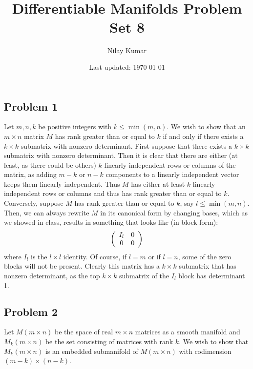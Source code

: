 \documentclass{../../mathnotes}
\title{Differentiable Manifolds Problem Set 8}
\author{Nilay Kumar}
\date{Last updated: \today}
\begin{document}
\maketitle

\subsection*{Problem 1}

Let $m,n,k$ be positive integers with $k\leq\min(m,n)$. We wish to show that an $m\times n$ matrix $M$ has rank greater
than or equal to $k$ if and only if there exists a $k\times k$ submatrix with nonzero determinant.
First suppose that there exists a $k\times k$ submatrix with nonzero determinant. Then it is clear that
there are either (at least, as there could be others) $k$ linearly independent rows or columns of the matrix, as adding $m-k$ or $n-k$ components
to a linearly independent vector keeps them linearly independent. Thus $M$ has either at least $k$ linearly independent rows
or columns and thus has rank greater than or equal to $k$.
Conversely, suppose $M$ has rank greater than or equal to $k$, say $l\leq \min(m,n)$. Then, we can always rewrite $M$ in its canonical form
by changing bases, which as we showed in class, results in something that looks like (in block form):
\begin{align*}
    \left(\begin{array}[]{cc}
        I_l & 0 \\
        0 & 0
    \end{array}\right)
\end{align*}
where $I_l$ is the $l\times l$ identity. Of course, if $l=m$ or if $l=n$, some of the zero blocks will not be present.
Clearly this matrix has a $k\times k$ submatrix that has nonzero determinant, as the top $k\times k$ submatrix of the
$I_l$ block has determinant 1. 


\subsection*{Problem 2}

Let $M(m\times n)$ be the space of real $m\times n$ matrices as a smooth manifold and $M_k(m\times n)$ be the set
consisting of matrices with rank $k$. We wish to show that $M_k(m\times n)$ is an embedded submanifold of $M(m\times n)$
with codimension $(m-k)\times (n-k)$.
\end{document}

